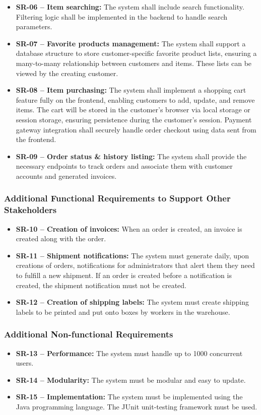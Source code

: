 \documentclass[a4paper,journal]{IEEEtran}
\begin{document}
\begin{itemize}
  \item \textbf{SR-06 -- Item searching: }The system shall include
  search functionality. Filtering logic shall be implemented in the backend to
  handle search parameters.
  \item \textbf{SR-07 -- Favorite products management:} The system
  shall support a database structure to store customer-specific favorite product
  lists, ensuring a many-to-many relationship between customers and items. These
  lists can be viewed by the creating customer.
  \item \textbf{SR-08 -- Item purchasing:} The system shall
  implement a shopping cart feature fully on the frontend, enabling customers to
  add, update, and remove items. The cart will be stored in the customer's
  browser via local storage or session storage, ensuring persistence during the customer's
  session. Payment gateway integration shall securely handle order checkout using
  data sent from the frontend.
  \item \textbf{SR-09 -- Order status \& history listing:} The system shall provide the necessary
  endpoints to track orders and associate them with customer accounts and
  generated invoices.
\end{itemize}
\subsubsection{Additional Functional Requirements to Support Other Stakeholders}
\begin{itemize}
  \item \textbf{SR-10 -- Creation of invoices: }When an order is
  created, an invoice is created along with the order.
  \item \textbf{SR-11 -- Shipment notifications:} The system must
  generate daily, upon creations of orders, notifications for administrators that
  alert them they need to fulfill a new shipment. If an order is created before a
  notification is created, the shipment notification must not be created.
  \item \textbf{SR-12 -- Creation of shipping labels:} The system must create shipping labels to be
  printed and put onto boxes by workers in the warehouse.
\end{itemize}
\subsubsection{Additional Non-functional Requirements}
\begin{itemize}
  \item \textbf{SR-13 -- Performance:} The system must handle up to
  1000 concurrent users.
  \item \textbf{SR-14 -- Modularity:} The system must be modular
  and easy to update.
  \item \textbf{SR-15 -- Implementation:} The system must be
  implemented using the Java programming language. The JUnit unit-testing
  framework must be used.
\end{itemize}
\end{document}
